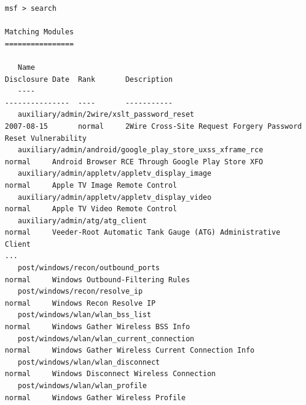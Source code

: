 \documentclass[12pt,a4paper]{report}
\begin{document}
\begin{lstlisting}[breaklines]
msf > search

Matching Modules
================

   Name                                                                     Disclosure Date  Rank       Description
   ----                                                                     ---------------  ----       -----------
   auxiliary/admin/2wire/xslt_password_reset                                2007-08-15       normal     2Wire Cross-Site Request Forgery Password Reset Vulnerability
   auxiliary/admin/android/google_play_store_uxss_xframe_rce                                 normal     Android Browser RCE Through Google Play Store XFO
   auxiliary/admin/appletv/appletv_display_image                                             normal     Apple TV Image Remote Control
   auxiliary/admin/appletv/appletv_display_video                                             normal     Apple TV Video Remote Control
   auxiliary/admin/atg/atg_client                                                            normal     Veeder-Root Automatic Tank Gauge (ATG) Administrative Client
...
   post/windows/recon/outbound_ports                                                         normal     Windows Outbound-Filtering Rules
   post/windows/recon/resolve_ip                                                             normal     Windows Recon Resolve IP
   post/windows/wlan/wlan_bss_list                                                           normal     Windows Gather Wireless BSS Info
   post/windows/wlan/wlan_current_connection                                                 normal     Windows Gather Wireless Current Connection Info
   post/windows/wlan/wlan_disconnect                                                         normal     Windows Disconnect Wireless Connection
   post/windows/wlan/wlan_profile                                                            normal     Windows Gather Wireless Profile
\end{lstlisting}
\end{document}
